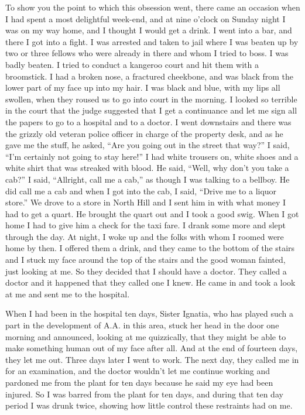 \begin{biblechapter}
\verse To show you the point to which this obsession went, 
    there came an occasion when I had spent a most delightful week-end, 
    and at nine o’clock on Sunday night I was on my way home, 
    and I thought I would get a drink.
\verse I went into a bar, and there I got into a fight.
\verse I was arrested and taken to jail 
    where I was beaten up by two or three fellows 
    who were already in there and whom I tried to boss.
\verse I was badly beaten.
\verse I tried to conduct a kangeroo court 
    and hit them with a broomstick.
\verse I had a broken nose, 
    a fractured cheekbone, 
    and was black from the lower part of my face 
    up into my hair.
\verse I was black and blue, with my lips all swollen, 
    when they roused us to go into court in the morning.
\verse I looked so terrible in the court 
    that the judge suggested that I get a continuance 
    and let me sign all the papers to go to a hospital and to a doctor.
\verse I went downstairs 
    and there was the grizzly old veteran police officer 
    in charge of the property desk, 
    and as he gave me the stuff, he asked, 
    “Are you going out in the street that way?”
\verse I said, “I’m certainly not going to stay here!”
\verse I had white trousers on, 
    white shoes and a white shirt that was streaked with blood.
\verse He said, “Well, why don’t you take a cab?”
\verse I said, “Allright, call me a cab,”
    as though I was talking to a bellboy.
\verse He did call me a cab and when I got into the cab, I said,
    “Drive me to a liquor store.”
\verse We drove to a store in North Hill 
    and I sent him in with what money I had to get a quart.
\verse He brought the quart out and I took a good swig.
\verse When I got home I had to give him a check for the taxi fare.
\verse I drank some more and slept through the day.
\verse At night, I woke up 
    and the folks with whom I roomed were home by then.
\verse I offered them a drink,
    and they came to the bottom of the stairs 
    and I stuck my face around the top of the stairs 
    and the good woman fainted, just looking at me.
\verse So they decided that I should have a doctor.
\verse They called a doctor 
    and it happened that they called one I knew.
\verse He came in and took a look at me and sent me to the hospital.

\verse When I had been in the hospital ten days, 
    Sister Ignatia, 
    who has played such a part in the development of A.A. in this area, 
    stuck her head in the door one morning and announced, 
    looking at me quizzically, 
    that they might be able to 
    make something human out of my face after all.
\verse And at the end of fourteen days, they let me out.
\verse Three days later I went to work.
\verse The next day, they called me in for an examination, 
    and the doctor wouldn’t let me continue working 
    and pardoned me from the plant for ten days 
    because he said my eye had been injured.
\verse So I was barred from the plant for ten days, 
    and during that ten day period I was drunk twice, 
    showing how little control these restraints had on me.


\end{biblechapter}
